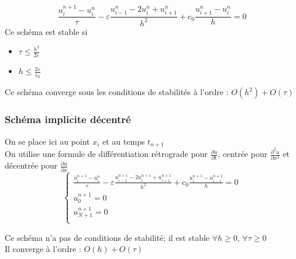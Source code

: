 \documentclass[../main.tex]{subfiles}
\begin{document}
\begin{equation}
    \frac{u_i^{n+1}-u_i^n}{\tau} - \varepsilon \frac{u_{i-1}^n - 2u_i^n + u_{i+1}^n}{h^2} + c_0 \frac{u_{i+1}^n - u_i^n}{h} = 0
\end{equation}
Ce schéma est stable si \begin{itemize}
    \item $\tau \leq \frac{h^2}{2\varepsilon}$\\
    \item $h \leq \frac{2\varepsilon}{c_0}$\\
\end{itemize}
Ce schéma converge sous les conditions de stabilités à l'ordre : $O(h^2)+ O(\tau)$\\

\subsubsection{Schéma implicite décentré}
On se place ici au point $x_i$ et au temps $t_{n+1}$\\
On utilise une formule de différentiation rétrograde pour $ \frac{\partial u}{\partial t}$, centrée pour $\frac{\partial^2 u}{\partial x^2}$ et décentrée pour $\frac{\partial u}{\partial x}$\\

\begin{equation}
    \begin{cases}
        \frac{u_i^{n+1} - u_i^n}{\tau} - \varepsilon \frac{u_{i-1}^{n+1} - 2u_i^{n+1} + u_{i+1}^{n+1}}{h^2} + c_0 \frac{u_i^{n+1} - u_{i-1}^{n+1}}{h} = 0\\
        u_0^{n+1} = 0\\
        u_{N+1}^{n+1} = 0\\
    \end{cases}
\end{equation}

Ce schéma n'a pas de conditions de stabilité; il est stable $\forall h\geq 0$, $\forall \tau \geq 0$\\
Il converge à l'ordre : $O(h)+O(\tau)$\\
\end{document}
